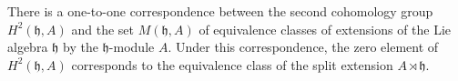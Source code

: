 There is a one-to-one correspondence between the second cohomology group $H^2(\mathfrak{h}, A)$ and the set $M(\mathfrak{h}, A)$ of equivalence classes of extensions of the Lie algebra $\mathfrak{h}$ by the $\mathfrak{h}$-module $A$. Under this correspondence, the zero element of $H^2(\mathfrak{h}, A)$ corresponds to the equivalence class of the split extension $A \rtimes \mathfrak{h}$.
